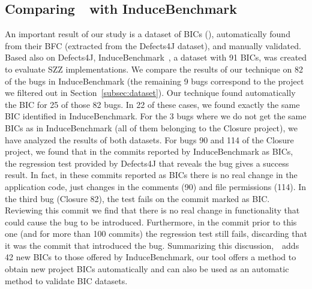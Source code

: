 \subsection{Comparing~\datasetName~with InduceBenchmark}
\label{sec:induce-benchmark}
An important result of our study is a dataset of BICs (\datasetName), automatically found from their BFC (extracted from the Defects4J dataset), and manually validated. 
Based also on Defects4J, InduceBenchmark~\cite{wen2019exploring}, a dataset with 91 BICs, was created to evaluate SZZ implementations. 
We compare the results of our technique on 82 of the bugs in InduceBenchmark (the remaining 9 bugs correspond to the project we filtered out in Section~\ref{subsec:dataset}). 
Our technique found automatically the BIC for 25 of those 82 bugs. In 22 of these cases, we found exactly the same BIC identified in InduceBenchmark.
For the 3 bugs where we do not get the same BICs as in InduceBenchmark (all of them belonging to the Closure project), we have analyzed the results of both datasets.
For bugs 90 and 114 of the Closure project, we found that in the commits reported by InduceBenchmark as BICs, the regression test provided by Defects4J that reveals the bug gives a success result. In fact, in these commits reported as BICs there is no real change in the application code, just changes in the comments (90) and file permissions (114).
In the third bug (Closure 82), the test fails on the commit marked as BIC. Reviewing this commit we find that there is no real change in functionality that could cause the bug to be introduced. Furthermore, in the commit prior to this one (and for more than 100 commits) the regression test still fails, discarding that it was the commit that introduced the bug. 
Summarizing this discussion,~\datasetName~adds 42 new BICs to those offered by InduceBenchmark, our tool offers a method to obtain new project BICs automatically and can also be used as an automatic method to validate BIC datasets.

